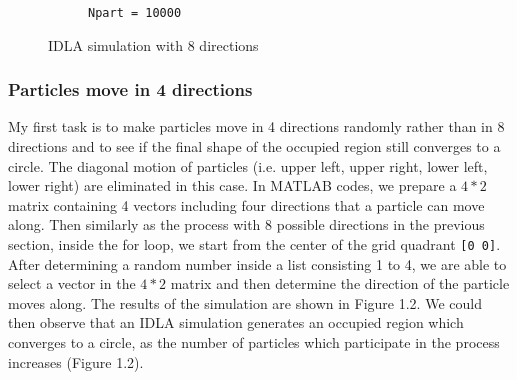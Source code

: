 \documentclass[letterpaper]{article}
\numberwithin{equation}{section} %
\numberwithin{figure}{section} %
\numberwithin{table}{section} %
\begin{document}
\begin{figure}[htbp]
\begin{subfigure}[b]{0.3\textwidth}
		\caption{\texttt{Npart = 10000}}
		\label{8direct_Npart10000_3suW11T}
	\end{subfigure}
	\caption{IDLA simulation with 8 directions}
	\label{IDLA simulation with 8 directions}
\end{figure}
	



\subsubsection{Particles move in 4 directions}
My first task is to make particles move in 4 directions randomly rather than in 8 directions and to see if the final shape of the occupied region still converges to a circle. The diagonal motion of particles (i.e. upper left, upper right, lower left, lower right) are eliminated in this case. In MATLAB codes, we prepare a $4*2$ matrix containing 4 vectors including four directions that a particle can move along. Then similarly as the process with 8 possible directions in the previous section, inside the for loop, we start from the center of the grid quadrant \texttt{[0 0]}. After determining a random number inside a list consisting 1 to 4, we are able to select a vector in the $4*2$ matrix and then determine the direction of the particle moves along. The results of the simulation are shown in Figure 1.2. We could then observe that an IDLA simulation generates an occupied region which converges to a circle, as the number of particles which participate in the process increases (Figure 1.2).
\end{document}
